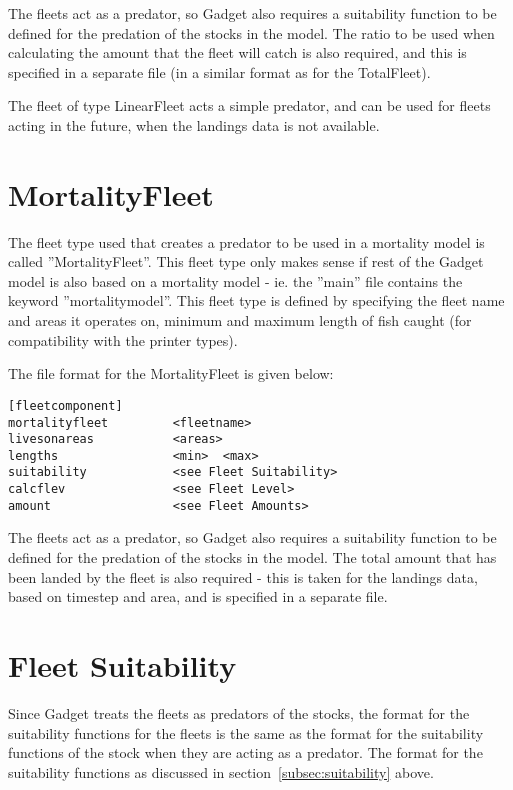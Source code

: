 \documentclass [a4paper, 10pt]{book}
\begin{document}
\bigskip
The fleets act as a predator, so Gadget also requires a suitability function to be defined for the predation of the stocks in the model.  The ratio to be used when calculating the amount that the fleet will catch is also required, and this is specified in a separate file (in a similar format as for the TotalFleet).

\bigskip
The fleet of type LinearFleet acts a simple predator, and can be used for fleets acting in the future, when the landings data is not available.

\section{MortalityFleet}\label{sec:mortalityfleet}
The fleet type used that creates a predator to be used in a mortality model is called ''MortalityFleet''.  This fleet type only makes sense if rest of the Gadget model is also based on a mortality model - ie. the ''main'' file contains the keyword ''mortalitymodel''.  This fleet type is defined by specifying the fleet name and areas it operates on, minimum and maximum length of fish caught (for compatibility with the printer types).

\bigskip
The file format for the MortalityFleet is given below:

{\small\begin{verbatim}
[fleetcomponent]
mortalityfleet         <fleetname>
livesonareas           <areas>
lengths                <min>  <max>
suitability            <see Fleet Suitability>
calcflev               <see Fleet Level>
amount                 <see Fleet Amounts>
\end{verbatim}}

The fleets act as a predator, so Gadget also requires a suitability function to be defined for the predation of the stocks in the model.  The total amount that has been landed by the fleet is also required - this is taken for the landings data, based on timestep and area, and is specified in a separate file.

\section{Fleet Suitability}\label{sec:fleetsuit}
Since Gadget treats the fleets as predators of the stocks, the format for the suitability functions for the fleets is the same as the format for the suitability functions of the stock when they are acting as a predator.  The format for the suitability functions as discussed in section~\ref{subsec:suitability} above.
\end{document}
